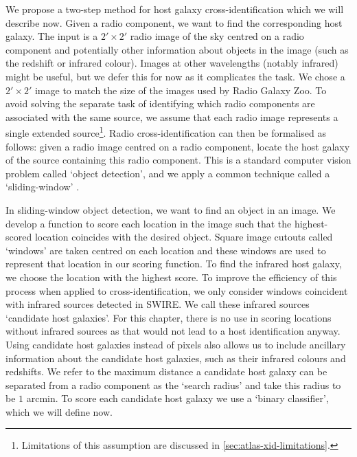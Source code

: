     We propose a two-step method for host galaxy cross-identification
    {which we will describe now}. Given a radio component, we want to find
    the corresponding host galaxy. The input is a $2' \times
    2'$ radio image of
    the sky centred on a radio component {and potentially other information about
    objects in the image (such as the redshift or infrared colour)}. {Images at other wavelengths (notably infrared) might be
    useful, but we defer this for now as it complicates the task.
    {We chose a $2' \times 2'$ image to match} the size of the images used
    by Radio Galaxy Zoo. To avoid solving the separate task of identifying
    which radio components are associated with the same source, we assume
    that each radio image represents a single extended
    source\footnote{Limitations of this assumption are discussed in
    \autoref{sec:atlas-xid-limitations}.}. Radio cross-identification can then
    be formalised as follows: given a radio image centred on a radio
    component, locate the host galaxy of the source containing this radio
    component. This is a standard computer vision problem called `object
    detection', and we apply a common technique called a `sliding-window'
    \citep{rowley1996facedetection}}.

    {In sliding-window object detection, we want to find an object in an image.
    We develop a function to score each location in the image such that the
    highest-scored location coincides with the desired object. Square image
    cutouts called `windows' are taken centred on each location and these
    windows are used to represent that location in our scoring function. To
    find the infrared host galaxy, we choose the location with the highest
    score. To improve the efficiency of this process when applied to
    cross-identification, we only consider windows coincident with infrared
    sources detected in SWIRE. We call these infrared sources `candidate
    host galaxies'. For this chapter, there is no use in scoring
    locations without infrared sources as that would not lead to a host identification
    anyway. Using candidate host galaxies instead of pixels also
    allows us to include ancillary information about the candidate host
    galaxies, such as their infrared colours and redshifts. We refer to the
    maximum distance a candidate host galaxy can be separated from a radio component as
    the `search radius' and take this radius to be $1$ arcmin. To score each
    candidate host galaxy we use a `binary classifier', which we will define
    now.}

